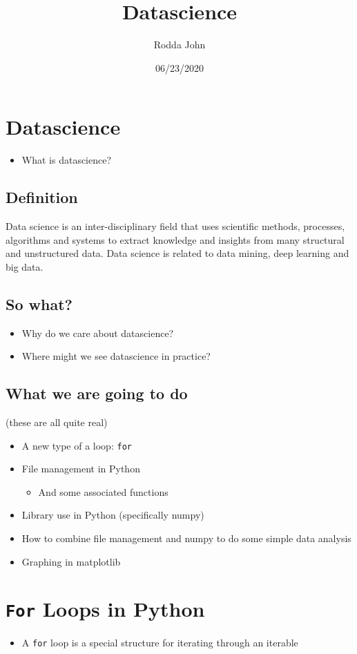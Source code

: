 \documentclass[11pt]{article}
\author{Rodda John}
\date{06/23/2020}
\title{Datascience}
\begin{document}
\maketitle

\section{Datascience}
\label{sec:orgf98bf56}
\begin{itemize}
\item What is datascience?
\end{itemize}
\subsection{Definition}
\label{sec:org2dfb81a}
Data science is an inter-disciplinary field that uses scientific methods, processes, algorithms and systems to extract knowledge and insights from many structural and unstructured data. Data science is related to data mining, deep learning and big data.
\subsection{So what?}
\label{sec:orgfa2adc6}
\begin{itemize}
\item Why do we care about datascience?
\item Where might we see datascience in practice?
\end{itemize}
\subsection{What we are going to do}
\label{sec:orge82de1c}
(these are all quite real)
\begin{itemize}
\item A new type of a loop: \texttt{for}
\item File management in Python
\begin{itemize}
\item And some associated functions
\end{itemize}
\item Library use in Python (specifically numpy)
\item How to combine file management and numpy to do some simple data analysis
\item Graphing in matplotlib
\end{itemize}
\section{\texttt{For} Loops in Python}
\label{sec:orgd64b99f}
\begin{itemize}
\item A \texttt{for} loop is a special structure for iterating through an iterable
\end{itemize}
\end{document}
